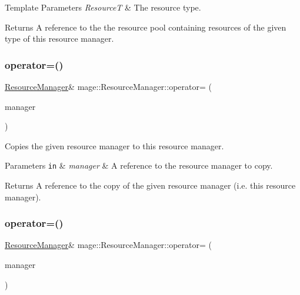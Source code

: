 \begin{DoxyTemplParams}{Template Parameters}
{\em ResourceT} & The resource type. \\
\hline
\end{DoxyTemplParams}
\begin{DoxyReturn}{Returns}
A reference to the the resource pool containing resources of the given type of this resource manager. 
\end{DoxyReturn}
\hypertarget{classmage_1_1_resource_manager_ab0ca87429aaded525d03320dabd5cc67}{}\label{classmage_1_1_resource_manager_ab0ca87429aaded525d03320dabd5cc67} 
\subsubsection{\texorpdfstring{operator=()}{operator=()}\hspace{0.1cm}{\footnotesize\ttfamily [1/2]}}
{\footnotesize\ttfamily \hyperlink{classmage_1_1_resource_manager}{Resource\+Manager}\& mage\+::\+Resource\+Manager\+::operator= (\begin{DoxyParamCaption}\item[{const \hyperlink{classmage_1_1_resource_manager}{Resource\+Manager} \&}]{manager }\end{DoxyParamCaption})\hspace{0.3cm}{\ttfamily [delete]}}

Copies the given resource manager to this resource manager.


\begin{DoxyParams}[1]{Parameters}
\mbox{\tt in}  & {\em manager} & A reference to the resource manager to copy. \\
\hline
\end{DoxyParams}
\begin{DoxyReturn}{Returns}
A reference to the copy of the given resource manager (i.\+e. this resource manager). 
\end{DoxyReturn}
\hypertarget{classmage_1_1_resource_manager_ac301d52cd5d6418013458f8090e19c88}{}\label{classmage_1_1_resource_manager_ac301d52cd5d6418013458f8090e19c88} 
\subsubsection{\texorpdfstring{operator=()}{operator=()}\hspace{0.1cm}{\footnotesize\ttfamily [2/2]}}
{\footnotesize\ttfamily \hyperlink{classmage_1_1_resource_manager}{Resource\+Manager}\& mage\+::\+Resource\+Manager\+::operator= (\begin{DoxyParamCaption}\item[{\hyperlink{classmage_1_1_resource_manager}{Resource\+Manager} \&\&}]{manager }\end{DoxyParamCaption})\hspace{0.3cm}{\ttfamily [delete]}}

